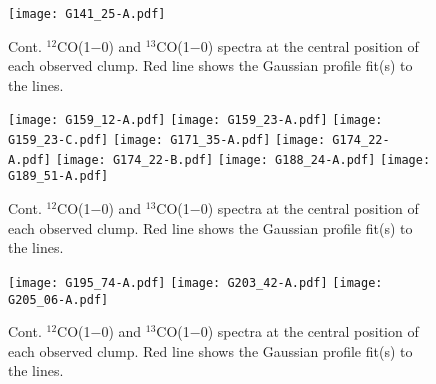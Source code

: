 \documentclass[printer]{aa}
\begin{document}
\begin{appendix}
\begin{figure*}[th]
		\texttt{[image: G141\_25-A.pdf]}
    \caption{Cont. $^{12}$CO(1$-$0) and $^{13}$CO(1$-$0) spectra at the central position of each observed clump. Red line shows the Gaussian profile fit(s) to the lines.}
	\label{spec3}
\end{figure*}
\begin{figure*}[th]
	\centering		
		\texttt{[image: G159\_12-A.pdf]}
        \texttt{[image: G159\_23-A.pdf]}
		\texttt{[image: G159\_23-C.pdf]}
		\texttt{[image: G171\_35-A.pdf]}
		\texttt{[image: G174\_22-A.pdf]}
		\texttt{[image: G174\_22-B.pdf]}
		\texttt{[image: G188\_24-A.pdf]}
		\texttt{[image: G189\_51-A.pdf]}
    \caption{Cont. $^{12}$CO(1$-$0) and $^{13}$CO(1$-$0) spectra at the central position of each observed clump. Red line shows the Gaussian profile fit(s) to the lines.}
	\label{spec4}
\end{figure*}
\begin{figure*}[th]
	\centering		
		\texttt{[image: G195\_74-A.pdf]}
    	\texttt{[image: G203\_42-A.pdf]}
		\texttt{[image: G205\_06-A.pdf]}
    \caption{Cont. $^{12}$CO(1$-$0) and $^{13}$CO(1$-$0) spectra at the central position of each observed clump. Red line shows the Gaussian profile fit(s) to the lines.}
	\label{spec5}
\end{figure*}

\end{appendix}
 
\end{document}
